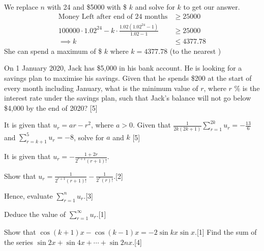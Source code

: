 \documentclass[12pt, a4 paper]{article}
\begin{document}
\begin{outline}[enumerate]
 \begin{answer}
  We replace \(n\) with 24 and \$5000 with \$ \(k\) and solve for \(k\) to get our answer.
  \begin{align*}
   \textrm{Money Left after end of 24 months}                      & \geq 25000   \\
   100000 \cdot 1.02^{24} - k\cdot\frac{1.02(1.02^{24}-1)}{1.02-1} & \geq 25000   \\
   \implies k                                                      & \leq 4377.78
  \end{align*}
  She can spend a maximum of \$ \(k\) where \(k = 4377.78\) (to the nearest \textcent)
 \end{answer}
 \1 On 1 January 2020, Jack has \$5,000 in his bank account. He is looking for a savings plan to maximise his savings. Given that he spends \$200 at the start of every month including January, what is the minimum value of \(r\), where \(r\) \% is the interest rate under the savings plan, such that Jack's balance will not go below \$4,000 by the end of 2020? \hfill[5] %

 \1 It is given that \(u_{r}=ar-r^2\), where \(a>0\). Given that \(\frac{1}{2k(2k+1)}\sum\limits_{r=1}^{2k}u_{r}=-\frac{13}{6}\) and \(\sum\limits_{r=k+1}^{5}u_{r}=-8\), solve for \(a\)  and \(k\) \hfill[5] %

 \1 It is given that \(u_{r}=-\frac{1+2r}{2^{r+1}(r+1)!}\). %

 \2 Show that \(u_{r}=\frac{1}{2^{r+1}(r+1)!}-\frac{1}{2^{r}(r)!}\).\hfill[2]

 \2 Hence, evaluate \(\sum\limits_{r=1}^{n}u_r\).\hfill[3]

 \2 Deduce the value of \(\sum\limits_{r=1}^{\infty}u_r\).\hfill[1]

 \1
 \2 Show that \(\cos{(k+1)}x-\cos{(k-1)x}=-2\sin{kx}\sin{x}\).\hfill[1]
 \2 Find the sum of the series \(\sin{2x}+\sin{4x}+\cdots+\sin{2nx}\).\hfill[4]%


\end{outline}
\end{document}
